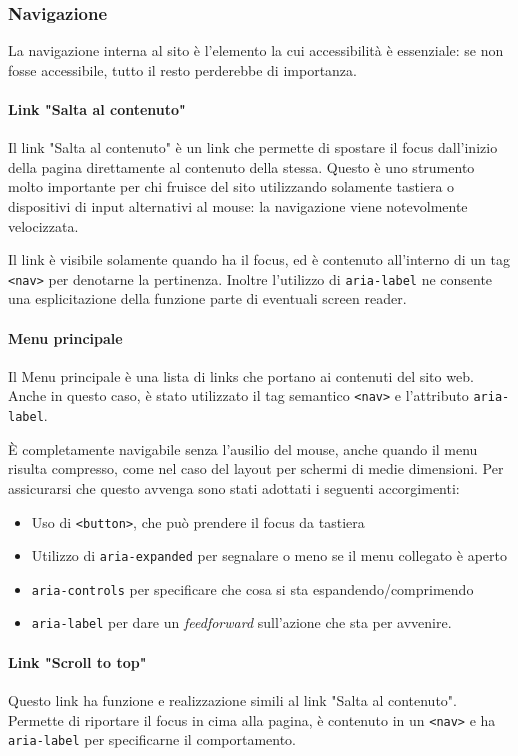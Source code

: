 \subsubsection{Navigazione}
La navigazione interna al sito è l'elemento la cui accessibilità è essenziale: se non fosse accessibile, tutto il resto perderebbe di importanza.
\paragraph{Link "Salta al contenuto"} Il link "Salta al contenuto" è un link che permette di spostare il focus dall'inizio della pagina direttamente al contenuto della stessa. Questo è uno strumento molto importante per chi fruisce del sito utilizzando solamente tastiera o dispositivi di input alternativi al mouse: la navigazione viene notevolmente velocizzata.

Il link è visibile solamente quando ha il focus, ed è contenuto all'interno di un tag \verb|<nav>| per denotarne la pertinenza. Inoltre l'utilizzo di \verb|aria-label| ne consente una esplicitazione della funzione parte di eventuali screen reader.

\paragraph{Menu principale}
Il Menu principale è una lista di links che portano ai contenuti del sito web. Anche in questo caso, è stato utilizzato il tag semantico \verb|<nav>| e l'attributo \verb|aria-label|.

È completamente navigabile senza l'ausilio del mouse, anche quando il menu risulta compresso, come nel caso del layout per schermi di medie dimensioni. Per assicurarsi che questo avvenga sono stati adottati i seguenti accorgimenti:
\begin{itemize}
    \item Uso di \verb|<button>|, che può prendere il focus da tastiera
    \item Utilizzo di \verb|aria-expanded| per segnalare o meno se il menu collegato è aperto
    \item \verb|aria-controls| per specificare che cosa si sta espandendo/comprimendo
    \item \verb|aria-label| per dare un \textit{feedforward} sull'azione che sta per avvenire.
\end{itemize}
\paragraph{Link "Scroll to top"}
Questo link ha funzione e realizzazione simili al link "Salta al contenuto". Permette di riportare il focus in cima alla pagina, è contenuto in un \verb|<nav>| e ha \verb|aria-label| per specificarne il comportamento.

